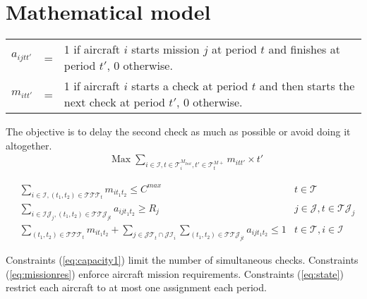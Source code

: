 \documentclass{roadef}
\begin{document}
\section{Mathematical model}
		
    \begin{tabular}{p{5mm}lp{130mm}}
        $a_{ijtt'}$ & =& 1 if aircraft $i$ starts mission $j$ at period $t$ and finishes at period $t'$, 0 otherwise. \\  
        $m_{itt'}$  & =& 1 if aircraft $i$ starts a check at period $t$ and then starts the next check at period $t'$, 0 otherwise. \\
    \end{tabular}

    The objective is to delay the second check as much as possible or avoid doing it altogether.
    \begin{align}
        & \text{Max}\; 
        \sum_{
                i \in \mathcal{I}, t \in \mathcal{T}^{M_{Init}}_i, t' \in \mathcal{T}^{M+}_t
            } m_{itt'} \times t'
        \label{eq:objective1}
    \end{align}
    
    \begin{align}
        & \sum_{i \in \mathcal{I}, (t_1, t_2) \in \mathcal{T}\mathcal{T}\mathcal{T}_{t}} m_{it_1t_2} \leq C^{max} 
                & t \in \mathcal{T} \label{eq:capacity1}\\
        & \sum_{i \in \mathcal{IJ}_j, (t_1, t_2) \in \mathcal{T}\mathcal{T}\mathcal{J}_{jt}} a_{ijt_1t_2} \geq R_j
                & j \in \mathcal{J}, t \in \mathcal{TJ}_j  \label{eq:missionres}\\
        & \sum_{(t_1, t_2) \in \mathcal{T}\mathcal{T}\mathcal{T}_{t}} m_{it_1t_2} + \sum_{j \in \mathcal{JT}_t \cap \mathcal{JI}_i} \sum_{(t_1, t_2) \in \mathcal{T}\mathcal{T}\mathcal{J}_{jt}} a_{ijt_1t_2} \leq 1 
                & t \in \mathcal{T}, i \in \mathcal{I} \label{eq:state}
    \end{align}

    Constraints (\ref{eq:capacity1}) limit the number of simultaneous checks. Constraints (\ref{eq:missionres}) enforce aircraft mission requirements. Constraints (\ref{eq:state}) restrict each aircraft to at most one assignment each period.
\end{document}
